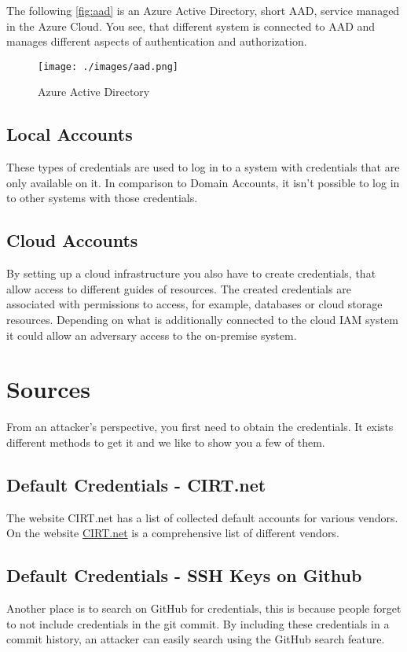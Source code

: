 The following \autoref{fig:aad} is an Azure Active Directory, short AAD, service managed in the Azure Cloud.
You see, that different system is connected to AAD and manages different aspects of authentication and authorization.

\begin{figure}[h]
    \centering
    \texttt{[image: ./images/aad.png]}
    \caption{Azure Active Directory}
    \label{fig:aad}
\end{figure}

\section{Local Accounts}
These types of credentials are used to log in to a system with credentials that are only available on it.
In comparison to Domain Accounts, it isn't possible to log in to other systems with those credentials.

\section{Cloud Accounts}
By setting up a cloud infrastructure you also have to create credentials, that allow access to different guides of resources.
The created credentials are associated with permissions to access, for example, databases or cloud storage resources.
Depending on what is additionally connected to the cloud IAM system it could allow an adversary access to the on-premise system.

\chapter{Sources}
\label{chapter:validaccounts_sources}
From an attacker's perspective, you first need to obtain the credentials.
It exists different methods to get it and we like to show you a few of them.

\section{Default Credentials - CIRT.net}
The website CIRT.net has a list of collected default accounts for various vendors.
On the website \href{https://cirt.net/passwords}{CIRT.net} is a comprehensive list of different vendors.

\section{Default Credentials - SSH Keys on Github}
Another place is to search on GitHub for credentials, this is because people forget to not include credentials in the git commit.
By including these credentials in a commit history, an attacker can easily search using the GitHub search feature.

